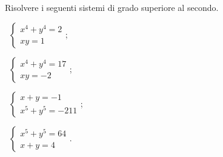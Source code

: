 \begin{esercizio}[\Ast]
 \label{ese:6.30}
Risolvere i seguenti sistemi di grado superiore al secondo.
\begin{multicols}{2}
 \begin{enumeratea}
 \item~$\left\{\begin{array}{l}x^4+y^4=2\\xy=1\end{array}\right.$;
 \item~$\left\{\begin{array}{l}x^4+y^4=17\\xy=-2\end{array}\right.$;
 \item~$\left\{\begin{array}{l}{x+y=-1}\\{x^5+y^5=-211}\end{array}\right.$;
 \item~$\left\{\begin{array}{l}x^5+y^5=64\\x+y=4\end{array}\right.$.
 \end{enumeratea}
 \end{multicols}
\end{esercizio}

